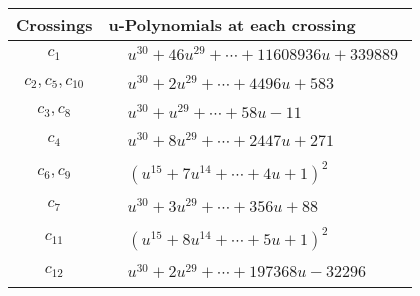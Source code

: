\documentclass[1p]{elsarticle_modified}
\theoremstyle{definition}
\begin{document}
\begin{tabular}{m{50pt}|m{274pt}}
Crossings & \hspace{64pt}u-Polynomials at each crossing \\
\hline $$\begin{aligned}c_{1}\end{aligned}$$&$\begin{aligned}
&u^{30}+46 u^{29}+\cdots+11608936 u+339889
\end{aligned}$\\
\hline $$\begin{aligned}c_{2},c_{5},c_{10}\end{aligned}$$&$\begin{aligned}
&u^{30}+2 u^{29}+\cdots+4496 u+583
\end{aligned}$\\
\hline $$\begin{aligned}c_{3},c_{8}\end{aligned}$$&$\begin{aligned}
&u^{30}+u^{29}+\cdots+58 u-11
\end{aligned}$\\
\hline $$\begin{aligned}c_{4}\end{aligned}$$&$\begin{aligned}
&u^{30}+8 u^{29}+\cdots+2447 u+271
\end{aligned}$\\
\hline $$\begin{aligned}c_{6},c_{9}\end{aligned}$$&$\begin{aligned}
&(u^{15}+7 u^{14}+\cdots+4 u+1)^{2}
\end{aligned}$\\
\hline $$\begin{aligned}c_{7}\end{aligned}$$&$\begin{aligned}
&u^{30}+3 u^{29}+\cdots+356 u+88
\end{aligned}$\\
\hline $$\begin{aligned}c_{11}\end{aligned}$$&$\begin{aligned}
&(u^{15}+8 u^{14}+\cdots+5 u+1)^{2}
\end{aligned}$\\
\hline $$\begin{aligned}c_{12}\end{aligned}$$&$\begin{aligned}
&u^{30}+2 u^{29}+\cdots+197368 u-32296
\end{aligned}$\\
\hline
\end{tabular}\\~\\
\end{document}
